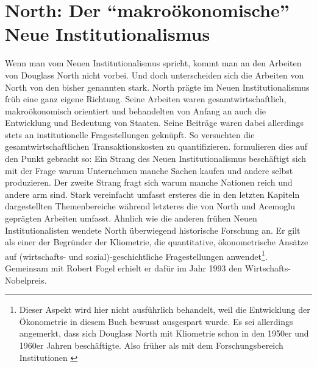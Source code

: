 \section{North: Der "`makroökonomische"' Neue Institutionalismus}
\label{sec: North}
Wenn man vom Neuen Institutionalismus spricht, kommt man an den Arbeiten von Douglass North nicht vorbei. Und doch unterscheiden sich die Arbeiten von North von den bisher genannten stark. North prägte im Neuen Institutionalismus früh eine ganz eigene Richtung. Seine Arbeiten waren gesamtwirtschaftlich, makroökonomisch orientiert und behandelten von Anfang an auch die Entwicklung und Bedeutung von Staaten. Seine Beiträge waren dabei allerdings stets an institutionelle Fragestellungen geknüpft. So versuchten \textcite{Wallis1986} die gesamtwirtschaftlichen Transaktionskosten zu quantifizieren. \textcite[S. 3]{Menard2014} formulieren dies auf den Punkt gebracht so: Ein Strang des Neuen Institutionalismus beschäftigt sich mit der Frage warum Unternehmen manche Sachen kaufen und andere selbst produzieren. Der zweite Strang fragt sich warum manche Nationen reich und andere arm sind. Stark vereinfacht umfasst ersteres die in den letzten Kapiteln dargestellten Themenbereiche während letzteres die von North und Acemoglu geprägten Arbeiten umfasst. Ähnlich wie die anderen frühen Neuen Institutionalisten wendete North überwiegend historische Forschung an. Er gilt als einer der Begründer der Kliometrie, die quantitative, ökonometrische Ansätze auf (wirtschafts- und sozial)-geschichtliche Fragestellungen anwendet\footnote{Dieser Aspekt wird hier nicht ausführlich behandelt, weil die Entwicklung der Ökonometrie in diesem Buch bewusst ausgespart wurde. Es sei allerdings angemerkt, dass sich Douglass North mit Kliometrie schon in den 1950er und 1960er Jahren beschäftigte. Also früher als mit dem Forschungsbereich Institutionen \parencite[S. 12]{Menard2014}}. Gemeinsam mit Robert Fogel erhielt er dafür im Jahr 1993 den Wirtschafts-Nobelpreis.

